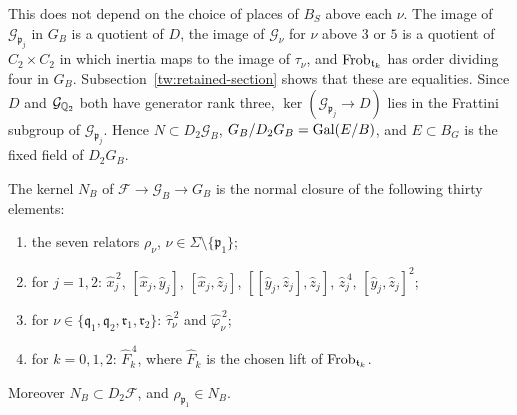 This does not depend on the choice of places of $B_S$ above each $\nu$. The
image of $\mathcal G_{\mathfrak p_j}$ in $G_B$ is a quotient of $D$, the image
of $\mathcal G_\nu$ for $\nu$ above $3$ or $5$ is a quotient of
$C_2\times C_2$ in which inertia maps to the image of $\tau_\nu$, and
$\operatorname{Frob}_{\mathfrak t_k}$ has order dividing four in $G_B$.
Subsection~\ref{tw:retained-section} shows that these are equalities. Since
$D$ and $\mathcal G_{\mathbb Q_2}$ both have generator rank three,
$\ker(\mathcal G_{\mathfrak p_j}\to D)$ lies in the Frattini subgroup of
$\mathcal G_{\mathfrak p_j}$. Hence $N\subset D_2\mathcal G_B$,
$G_B/D_2G_B=\operatorname{Gal}(E/B)$, and $E\subset B_G$ is the fixed field of $D_2G_B$.

\begin{lemma}\label{tw:GB-presentation}
The kernel $N_B$ of $\mathcal F\to\mathcal G_B\to G_B$ is the normal closure
of the following thirty elements:
\begin{enumerate}
\item[(i)] the seven relators $\rho_\nu$, $\nu\in\Sigma\setminus\{\mathfrak p_1\}$;
\item[(ii)] for $j=1,2$: $\hat x_j^{\,2}$, $[\hat x_j,\hat y_j]$,
 $[\hat x_j,\hat z_j]$, $[[\hat y_j,\hat z_j],\hat z_j]$, $\hat z_j^{\,4}$,
 $[\hat y_j,\hat z_j]^2$;
\item[(iii)] for $\nu\in\{\mathfrak q_1,\mathfrak q_2,\mathfrak r_1,\mathfrak r_2\}$:
 $\hat\tau_\nu^{\,2}$ and $\hat\varphi_\nu^{\,2}$;
\item[(iv)] for $k=0,1,2$: $\hat F_k^{\,4}$, where $\hat F_k$ is the chosen
 lift of $\operatorname{Frob}_{\mathfrak t_k}$.
\end{enumerate}
Moreover $N_B\subset D_2\mathcal F$, and $\rho_{\mathfrak p_1}\in N_B$.
\end{lemma}

